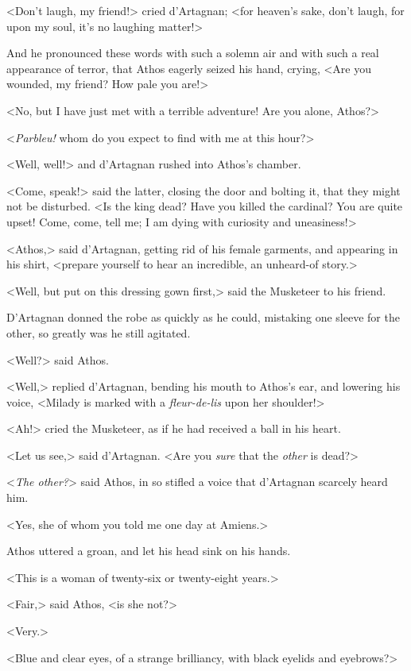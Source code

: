 <Don't laugh, my friend!> cried d'Artagnan; <for heaven's sake, don't laugh, for upon my soul, it's no laughing matter!> 

And he pronounced these words with such a solemn air and with such a real appearance of terror, that Athos eagerly seized his hand, crying, <Are you wounded, my friend? How pale you are!> 

<No, but I have just met with a terrible adventure! Are you alone, Athos?> 

<\textit{Parbleu!} whom do you expect to find with me at this hour?> 

<Well, well!> and d'Artagnan rushed into Athos's chamber. 

<Come, speak!> said the latter, closing the door and bolting it, that they might not be disturbed. <Is the king dead? Have you killed the cardinal? You are quite upset! Come, come, tell me; I am dying with curiosity and uneasiness!> 

<Athos,> said d'Artagnan, getting rid of his female garments, and appearing in his shirt, <prepare yourself to hear an incredible, an unheard-of story.> 

<Well, but put on this dressing gown first,> said the Musketeer to his friend. 

D'Artagnan donned the robe as quickly as he could, mistaking one sleeve for the other, so greatly was he still agitated. 

<Well?> said Athos. 

<Well,> replied d'Artagnan, bending his mouth to Athos's ear, and lowering his voice, <Milady is marked with a \textit{fleur-de-lis} upon her shoulder!> 

<Ah!> cried the Musketeer, as if he had received a ball in his heart. 

<Let us see,> said d'Artagnan. <Are you \textit{sure} that the \textit{other} is dead?> 

<\textit{The other?}> said Athos, in so stifled a voice that d'Artagnan scarcely heard him. 

<Yes, she of whom you told me one day at Amiens.> 

Athos uttered a groan, and let his head sink on his hands. 

<This is a woman of twenty-six or twenty-eight years.> 

<Fair,> said Athos, <is she not?> 

<Very.> 

<Blue and clear eyes, of a strange brilliancy, with black eyelids and eyebrows?> 

